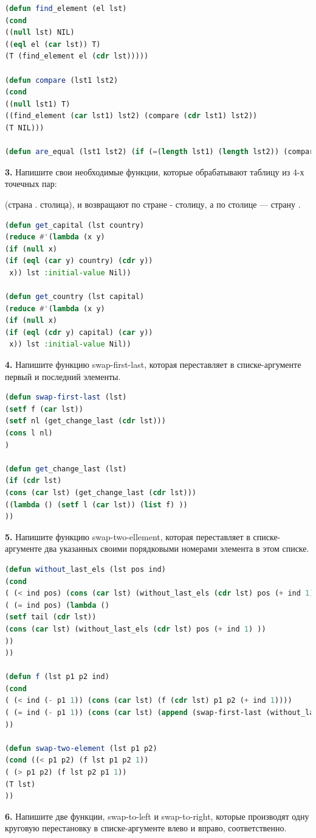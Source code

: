 \documentclass[12pt]{report}
\begin{document}
\begin{lstlisting}[label=third,caption=Решение задания №2, language=lisp]
(defun find_element (el lst)
(cond
((null lst) NIL)
((eql el (car lst)) T)
(T (find_element el (cdr lst)))))

(defun compare (lst1 lst2)
(cond
((null lst1) T)
((find_element (car lst1) lst2) (compare (cdr lst1) lst2))
(T NIL)))

(defun are_equal (lst1 lst2) (if (=(length lst1) (length lst2)) (compare lst1 lst2)))
\end{lstlisting}

\textbf{3.} Напишите свои необходимые функции, которые обрабатывают таблицу из 4-х точечных пар:

(страна . столица), и возвращают по стране - столицу, а по столице — страну .\\

\begin{lstlisting}[label=third,caption=Решение задания №3, language=lisp]
(defun get_capital (lst country) 
(reduce #'(lambda (x y) 
(if (null x)
(if (eql (car y) country) (cdr y))
 x)) lst :initial-value Nil))

(defun get_country (lst capital) 
(reduce #'(lambda (x y) 
(if (null x)
(if (eql (cdr y) capital) (car y))
 x)) lst :initial-value Nil))
\end{lstlisting}

\textbf{4.}  Напишите функцию swap-first-last, которая переставляет в списке-аргументе первый и
последний элементы.\\
\begin{lstlisting}[label=third,caption=Решение задания №4, language=lisp]
(defun swap-first-last (lst)
(setf f (car lst))
(setf nl (get_change_last (cdr lst)))
(cons l nl)
)

(defun get_change_last (lst)
(if (cdr lst)
(cons (car lst) (get_change_last (cdr lst)))
((lambda () (setf l (car lst)) (list f) ))
))
\end{lstlisting}
\textbf{5.} Напишите функцию swap-two-ellement, которая переставляет в списке- аргументе два
указанных своими порядковыми номерами элемента в этом списке.\\
\begin{lstlisting}[label=third,caption=Решение задания №5, language=lisp]
(defun without_last_els (lst pos ind)
(cond 
( (< ind pos) (cons (car lst) (without_last_els (cdr lst) pos (+ ind 1) )) )
( (= ind pos) (lambda () 
(setf tail (cdr lst))
(cons (car lst) (without_last_els (cdr lst) pos (+ ind 1) ))
))
))

(defun f (lst p1 p2 ind)
(cond 
( (< ind (- p1 1)) (cons (car lst) (f (cdr lst) p1 p2 (+ ind 1))))
( (= ind (- p1 1)) (cons (car lst) (append (swap-first-last (without_last_els (cdr lst) p2 p1)) tail) ) )
))

(defun swap-two-element (lst p1 p2)
(cond ((< p1 p2) (f lst p1 p2 1))
( (> p1 p2) (f lst p2 p1 1))
(T lst)
))
\end{lstlisting}
\textbf{6.} Напишите две функции, swap-to-left и swap-to-right, которые производят одну круговую
перестановку в списке-аргументе влево и вправо, соответственно.\\
\end{document}
